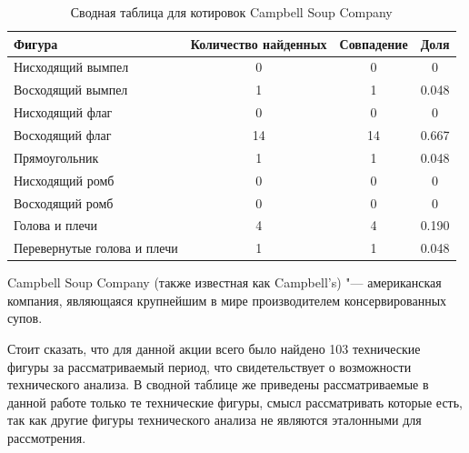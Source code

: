 \documentclass[bachelor, och, coursework]{SCWorks}
\begin{document}
    \begin{table}[!hbt]
        \centering
        \begin{tabular}{|l|c|c|c|}
        \hline
        Фигура                      & \multicolumn{1}{l|}{Количество найденных} & Совпадение & Доля  \\ \hline
        Нисходящий вымпел           & 0                                         & 0          & 0     \\ \hline
        Восходящий вымпел           & 1                                         & 1          & 0.048  \\ \hline
        Нисходящий флаг             & 0                                         & 0          & 0     \\ \hline
        Восходящий флаг             & 14                                        & 14         & 0.667 \\ \hline
        Прямоугольник               & 1                                         & 1          & 0.048 \\ \hline
        Нисходящий ромб             & 0                                         & 0          & 0     \\ \hline
        Восходящий ромб             & 0                                         & 0          & 0     \\ \hline
        Голова и плечи              & 4                                         & 4          & 0.190 \\ \hline
        Перевернутые голова и плечи & 1                                         & 1          & 0.048 \\ \hline
        \end{tabular}
        \captionsetup{justification=centering}
        \caption{Сводная таблица для котировок Campbell Soup Company}     
    \end{table}

    
    Campbell Soup Company (также известная как Campbell's) "--- американская 
    компания, являющаяся крупнейшим в мире производителем консервированных 
    супов.
    
    Стоит сказать, что для данной акции всего было найдено 103 технические
    фигуры за рассматриваемый период, что свидетельствует о возможности
    технического анализа. В сводной таблице же приведены рассматриваемые в 
    данной работе только те технические фигуры, смысл рассматривать которые
    есть, так как другие фигуры технического анализа не являются эталонными
    для рассмотрения.
    
\end{document}
